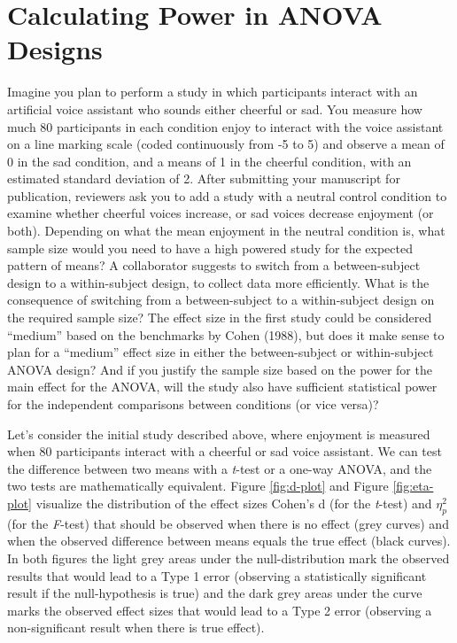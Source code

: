 \documentclass[,jou,floatsintext]{apa6}
\begin{document}
\hypertarget{calculating-power-in-anova-designs}{%
\section{Calculating Power in ANOVA Designs}\label{calculating-power-in-anova-designs}}

Imagine you plan to perform a study in which participants interact with an artificial voice assistant who sounds either cheerful or sad.
You measure how much 80 participants in each condition enjoy to interact with the voice assistant on a line marking scale (coded continuously from -5 to 5) and observe a mean of 0 in the sad condition, and a means of 1 in the cheerful condition, with an estimated standard deviation of 2.
After submitting your manuscript for publication, reviewers ask you to add a study with a neutral control condition to examine whether cheerful voices increase, or sad voices decrease enjoyment (or both).
Depending on what the mean enjoyment in the neutral condition is, what sample size would you need to have a high powered study for the expected pattern of means?
A collaborator suggests to switch from a between-subject design to a within-subject design, to collect data more efficiently.
What is the consequence of switching from a between-subject to a within-subject design on the required sample size?
The effect size in the first study could be considered \enquote{medium} based on the benchmarks by Cohen (1988), but does it make sense to plan for a \enquote{medium} effect size in either the between-subject or within-subject ANOVA design?
And if you justify the sample size based on the power for the main effect for the ANOVA, will the study also have sufficient statistical power for the independent comparisons between conditions (or vice versa)?

Let's consider the initial study described above, where enjoyment is measured when 80 participants interact with a cheerful or sad voice assistant.
We can test the difference between two means with a \emph{t}-test or a one-way ANOVA, and the two tests are mathematically equivalent.
Figure \ref{fig:d-plot} and Figure \ref{fig:eta-plot} visualize the distribution of the effect sizes Cohen's d (for the \emph{t}-test) and \(\eta_p^2\) (for the \emph{F}-test) that should be observed when there is no effect (grey curves) and when the observed difference between means equals the true effect (black curves).
In both figures the light grey areas under the null-distribution mark the observed results that would lead to a Type 1 error (observing a statistically significant result if the null-hypothesis is true) and the dark grey areas under the curve marks the observed effect sizes that would lead to a Type 2 error (observing a non-significant result when there is true effect).
\end{document}
